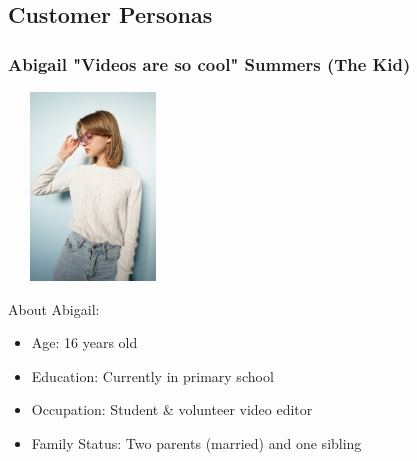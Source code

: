 \documentclass[letterpaper]{article}
\begin{document}
    \subsection{Customer Personas}
        \subsubsection{Abigail "Videos are so cool" Summers (The Kid)}
            \begin{multicols}{2}
                \includegraphics[width=4.5cm, height=5cm]{girl}
                \begin{large}
                    About Abigail:
                \end{large}
                \begin{itemize}
                    \item Age: 16 years old
                    \item Education: Currently in primary school
                    \item Occupation: Student \& volunteer video editor
                    \item Family Status: Two parents (married) and one sibling
                \end{itemize}
            \end{multicols}
\end{document}
